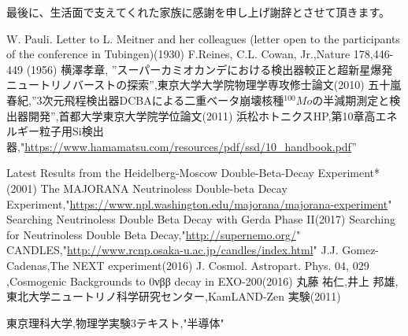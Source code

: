 \documentclass[a4paper,10pt]{jreport}
\begin{document}
最後に、生活面で支えてくれた家族に感謝を申し上げ謝辞とさせて頂きます。




\begin{thebibliography}{9}
 W. Pauli. Letter to L. Meitner and her colleagues (letter open to the participants of the conference in Tubingen)(1930)
 F.Reines, C.L. Cowan, Jr.,Nature 178,446-449 (1956)
 横澤孝章, ''スーパーカミオカンデにおける検出器較正と超新星爆発ニュートリノバーストの探索'',東京大学大学院物理学専攻修士論文(2010)
五十嵐春紀,''3次元飛程検出器DCBAによる二重ベータ崩壊核種$^{100}Mo$の半減期測定と検出器開発'',首都大学東京大学院学位論文(2011)
浜松ホトニクスHP,第10章高エネルギー粒子用Si検出器,"\url{https://www.hamamatsu.com/resources/pdf/ssd/10_handbook.pdf}''

Latest Results from the Heidelberg-Moscow Double-Beta-Decay Experiment*(2001)
The MAJORANA Neutrinoless Double-beta Decay Experiment,"\url{https://www.npl.washington.edu/majorana/majorana-experiment}"
Searching Neutrinoless Double Beta Decay with Gerda Phase II(2017)
Searching for Neutrinoless Double Beta Decay,"\url{http://supernemo.org/}"
CANDLES,"\url{http://www.rcnp.osaka-u.ac.jp/candles/index.html}"
J.J. Gomez-Cadenas,The NEXT experiment(2016)
J. Cosmol. Astropart. Phys. 04, 029 ,Cosmogenic Backgrounds to 0νββ decay in EXO-200(2016)
丸藤 祐仁,井上 邦雄,東北大学ニュートリノ科学研究センター,KamLAND-Zen 実験(2011)

東京理科大学,物理学実験3テキスト,"半導体"
\end{thebibliography}
\end{document}
